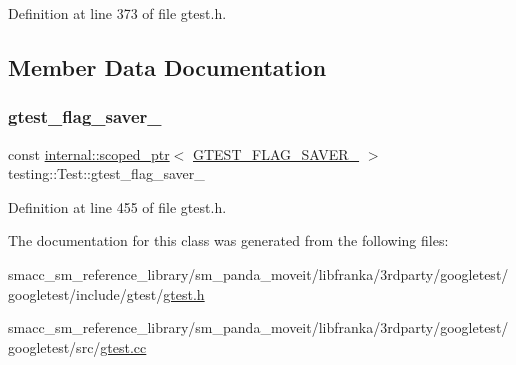 Definition at line 373 of file gtest.\+h.



\subsection{Member Data Documentation}
\mbox{\label{classtesting_1_1Test_a132c542f6932107234988d05a9980e49}} 
\subsubsection{\texorpdfstring{gtest\+\_\+flag\+\_\+saver\+\_\+}{gtest\_flag\_saver\_}}
{\footnotesize\ttfamily const \hyperlink{classtesting_1_1internal_1_1scoped__ptr}{internal\+::scoped\+\_\+ptr}$<$ \hyperlink{gtest-port_8h_a3749ef4fba6b3c3993609b336031644d}{G\+T\+E\+S\+T\+\_\+\+F\+L\+A\+G\+\_\+\+S\+A\+V\+E\+R\+\_\+} $>$ testing\+::\+Test\+::gtest\+\_\+flag\+\_\+saver\+\_\+\hspace{0.3cm}{\ttfamily [private]}}



Definition at line 455 of file gtest.\+h.



The documentation for this class was generated from the following files\+:\begin{DoxyCompactItemize}
\item 
smacc\+\_\+sm\+\_\+reference\+\_\+library/sm\+\_\+panda\+\_\+moveit/libfranka/3rdparty/googletest/googletest/include/gtest/\hyperlink{gtest_8h}{gtest.\+h}\item 
smacc\+\_\+sm\+\_\+reference\+\_\+library/sm\+\_\+panda\+\_\+moveit/libfranka/3rdparty/googletest/googletest/src/\hyperlink{gtest_8cc}{gtest.\+cc}\end{DoxyCompactItemize}
